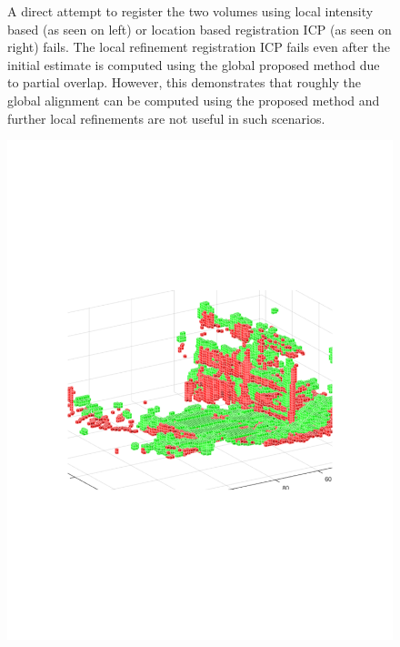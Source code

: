 \documentclass{UCF_ETD}
\begin{document}
\begin{figure}[H]
\begin{center}
\caption{ A direct attempt to register the two volumes using local  intensity based (as seen on left) or location based registration ICP (as seen on right)  fails. The local refinement registration ICP fails even after the initial estimate is computed using the global proposed method due to partial overlap. However, this demonstrates that roughly the global alignment can be computed using the proposed method and further local refinements are not useful in such scenarios.}
\label{ProblemScan12-13VoxelRegistered.fig}
\end{center}
\end{figure}

\begin{figure}[H] 
\begin{center}
\includegraphics[scale=0.58]{RobustRegistration/Scan13_14CloseUpDirectRegistered}

\end{center}
\end{figure}
\end{document}
